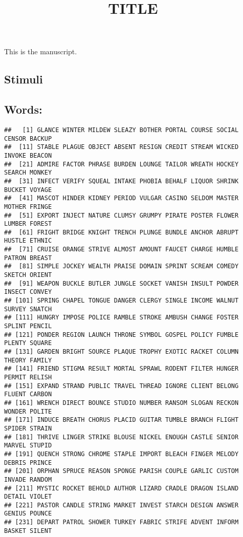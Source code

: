 \documentclass[
  english,
  man]{apa6}
\title{TITLE}
\author{\phantom{0}}
\date{}
\affiliation{\phantom{0}}
\begin{document}
\maketitle

This is the manuscript.


\clearpage



\begin{appendix}
\hypertarget{stimuli}{%
\section{Stimuli}\label{stimuli}}

\hypertarget{words}{%
\subsection{Words:}\label{words}}

\begin{verbatim}
##   [1] GLANCE WINTER MILDEW SLEAZY BOTHER PORTAL COURSE SOCIAL CENSOR BACKUP
##  [11] STABLE PLAGUE OBJECT ABSENT RESIGN CREDIT STREAM WICKED INVOKE BEACON
##  [21] ADMIRE FACTOR PHRASE BURDEN LOUNGE TAILOR WREATH HOCKEY SEARCH MONKEY
##  [31] INFECT VERIFY SQUEAL INTAKE PHOBIA BEHALF LIQUOR SHRINK BUCKET VOYAGE
##  [41] MASCOT HINDER KIDNEY PERIOD VULGAR CASINO SELDOM MASTER MOTHER FRINGE
##  [51] EXPORT INJECT NATURE CLUMSY GRUMPY PIRATE POSTER FLOWER LUMBER FOREST
##  [61] FRIGHT BRIDGE KNIGHT TRENCH PLUNGE BUNDLE ANCHOR ABRUPT HUSTLE ETHNIC
##  [71] CRUISE ORANGE STRIVE ALMOST AMOUNT FAUCET CHARGE HUMBLE PATRON BREAST
##  [81] SIMPLE JOCKEY WEALTH PRAISE DOMAIN SPRINT SCREAM COMEDY SKETCH ORIENT
##  [91] WEAPON BUCKLE BUTLER JUNGLE SOCKET VANISH INSULT POWDER INSECT CONVEY
## [101] SPRING CHAPEL TONGUE DANGER CLERGY SINGLE INCOME WALNUT SURVEY SNATCH
## [111] HUNGRY IMPOSE POLICE RAMBLE STROKE AMBUSH CHANGE FOSTER SPLINT PENCIL
## [121] PONDER REGION LAUNCH THRONE SYMBOL GOSPEL POLICY FUMBLE PLENTY SQUARE
## [131] GARDEN BRIGHT SOURCE PLAQUE TROPHY EXOTIC RACKET COLUMN THEORY FAMILY
## [141] FRIEND STIGMA RESULT MORTAL SPRAWL RODENT FILTER HUNGER PERMIT RELISH
## [151] EXPAND STRAND PUBLIC TRAVEL THREAD IGNORE CLIENT BELONG FLUENT CARBON
## [161] WRENCH DIRECT BOUNCE STUDIO NUMBER RANSOM SLOGAN RECKON WONDER POLITE
## [171] INDUCE BREATH CHORUS PLACID GUITAR TUMBLE BRANCH FLIGHT SPIDER STRAIN
## [181] THRIVE LINGER STRIKE BLOUSE NICKEL ENOUGH CASTLE SENIOR MARVEL STUPID
## [191] QUENCH STRONG CHROME STAPLE IMPORT BLEACH FINGER MELODY DEBRIS PRINCE
## [201] ORPHAN SPRUCE REASON SPONGE PARISH COUPLE GARLIC CUSTOM INVADE RANDOM
## [211] MYSTIC ROCKET BEHOLD AUTHOR LIZARD CRADLE DRAGON ISLAND DETAIL VIOLET
## [221] PASTOR CANDLE STRING MARKET INVEST STARCH DESIGN ANSWER GENIUS POUNCE
## [231] DEPART PATROL SHOWER TURKEY FABRIC STRIFE ADVENT INFORM BASKET SILENT
\end{verbatim}


\end{appendix}
\end{document}
